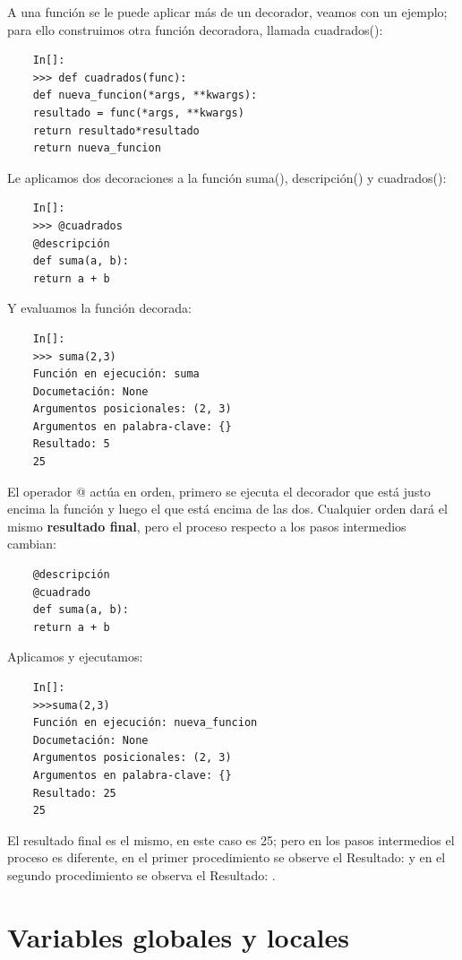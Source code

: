 A una función se le puede aplicar más de un decorador, veamos con un ejemplo; para ello construimos otra función decoradora, llamada {\ttfamily cuadrados()}:

\begin{lstlisting}
	In[]:
	>>> def cuadrados(func):
	def nueva_funcion(*args, **kwargs):
	resultado = func(*args, **kwargs)
	return resultado*resultado
	return nueva_funcion
\end{lstlisting}

Le aplicamos dos decoraciones a la función {\ttfamily suma()}, {\ttfamily descripción()} y  {\ttfamily cuadrados()}:

\begin{lstlisting}
	In[]:
	>>> @cuadrados	
	@descripción
	def suma(a, b):
	return a + b
\end{lstlisting}

Y evaluamos la función decorada:

\begin{lstlisting}
	In[]:	
	>>> suma(2,3)
	Función en ejecución: suma
	Documetación: None
	Argumentos posicionales: (2, 3)
	Argumentos en palabra-clave: {}
	Resultado: 5
	25
\end{lstlisting}

El operador {\ttfamily @} actúa en orden, primero se ejecuta el decorador que está justo encima la función  y luego
el que está encima de las dos.  Cualquier orden dará el mismo {\bf resultado final}, pero el proceso respecto a los pasos
intermedios cambian:

\begin{lstlisting}
	@descripción
	@cuadrado
	def suma(a, b):
	return a + b
\end{lstlisting}Aplicamos y ejecutamos:

\begin{lstlisting}
	In[]:
	>>>suma(2,3)
	Función en ejecución: nueva_funcion
	Documetación: None
	Argumentos posicionales: (2, 3)
	Argumentos en palabra-clave: {}
	Resultado: 25
	25
\end{lstlisting}El resultado final es el mismo, en este caso es 25; pero en los pasos intermedios el proceso es diferente, en el primer procedimiento se observe el {\ttfamily Resultado: } y en el segundo  procedimiento  se observa el {\ttfamily Resultado: }.



\section{Variables globales  y locales}

